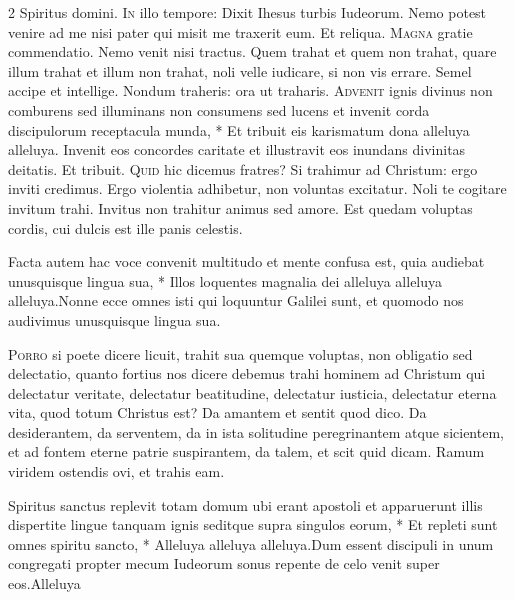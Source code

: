 \begin{multicols*}{2}
 \V Spiritus domini.
\lettrine[lines=2]{\zallmancaps \color{Red} I}{n} illo tempore: Dixit Ihesus turbis Iudeorum. Nemo potest venire ad me nisi pater qui misit me traxerit eum. Et reliqua.
\lettrine[lines=2]{\zallmancaps \color{Blue} M}{agna} gratie commendatio. Nemo venit nisi tractus. Quem trahat et quem non trahat, quare illum trahat et illum non trahat, noli velle iudicare, si non vis errare. Semel accipe et intellige. Nondum traheris: ora ut traharis. \R
\lettrine[lines=2]{\zallmancaps \color{Red} A}{dvenit} \hypertarget{advenit-ignis-divinus}{\label{advenit-ignis-divinus}} ignis divinus non comburens sed illuminans non consumens sed lucens et invenit corda discipulorum receptacula munda, * Et tribuit eis karismatum dona alleluya alleluya. \V Invenit eos concordes caritate et illustravit eos inundans divinitas deitatis. Et tribuit.
\lettrine[lines=2]{\zallmancaps \color{Blue} Q}{uid} hic dicemus fratres? Si trahimur ad Christum: ergo inviti credimus. Ergo violentia adhibetur, non voluntas excitatur. Noli te cogitare invitum trahi. Invitus non trahitur animus sed amore. Est quedam voluptas cordis, cui dulcis est ille panis celestis.
\begin{responsory}
{Facta autem hac voce convenit multitudo et mente confusa est, quia audiebat unusquisque lingua sua, * Illos loquentes magnalia dei alleluya alleluya alleluya.}{Nonne ecce omnes isti qui loquuntur Galilei sunt, et quomodo nos audivimus unusquisque lingua sua.}
\end{responsory}%
\lettrine[lines=2]{\zallmancaps \color{Red} P}{orro} si poete dicere licuit, trahit sua quemque voluptas, non obligatio sed delectatio, quanto fortius nos dicere debemus trahi hominem ad Christum qui delectatur veritate, delectatur beatitudine, delectatur iusticia, delectatur eterna vita, quod totum Christus est? Da amantem et sentit quod dico. Da desiderantem, da serventem, da in ista solitudine peregrinantem atque sicientem, et ad fontem eterne patrie suspirantem, da talem, et scit quid dicam. Ramum viridem ostendis ovi, et trahis eam.
\begin{responsory-final}
{Spiritus sanctus replevit totam domum ubi erant apostoli et apparuerunt illis dispertite lingue tanquam ignis seditque supra singulos eorum, * Et repleti sunt omnes spiritu sancto, * Alleluya alleluya alleluya.}{Dum essent discipuli in unum congregati propter mecum Iudeorum sonus repente de celo venit super eos.}{Alleluya}

\end{responsory-final}
\end{multicols*}
